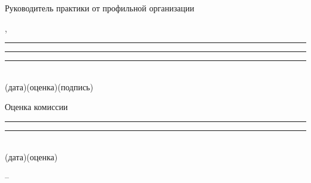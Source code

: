 \documentclass[12pt,a4paper]{extarticle}
\begin{document}
\ifhseHasCoSupervisor
\vspace{1.2em}
Руководитель практики от профильной организации

\smallskip
\hseCoSupervisorName, 

\vspace{0.7em}
\rule{2.6cm}{0.4pt}\quad\rule{3.2cm}{0.4pt}\quad{}\rule{4.2cm}{0.4pt}\\
{\scriptsize \hspace{0.4cm}(дата)\hspace{2.4cm}(оценка)\hspace{3.2cm}(подпись)}
\fi

\vspace{1.2em}
Оценка комиссии

\vspace{0.7em}
\rule{2.6cm}{0.4pt}\quad\rule{3.2cm}{0.4pt}\\
{\scriptsize \hspace{0.4cm}(дата)\hspace{2.4cm}(оценка)}

\vfill
\begin{center}
\hseCity{} -- \hseYear
\end{center}
\end{document}
